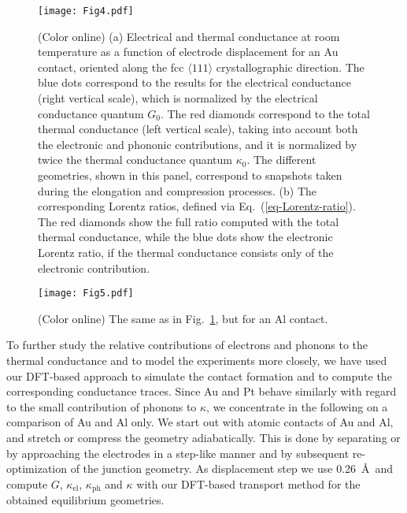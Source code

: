\documentclass[aps,amsmath,amssymb,twocolumn,showpacs]{revtex4-1}
\begin{document}
%
\begin{figure}[t]
\texttt{[image: Fig4.pdf]}
\caption{(Color online) (a) Electrical and thermal conductance at room
  temperature as a function of electrode displacement for an Au contact,
  oriented along the fcc $\langle 111 \rangle$ crystallographic direction. The
  blue dots correspond to the results for the electrical conductance (right
  vertical scale), which is normalized by the electrical conductance quantum
  $G_0$. The red diamonds correspond to the total thermal conductance (left
  vertical scale), taking into account both the electronic and phononic
  contributions, and it is normalized by twice the thermal conductance quantum
  $\kappa_0$. The different geometries, shown in this panel, correspond to
  snapshots taken during the elongation and compression processes. (b)
  The corresponding Lorentz ratios, defined via Eq.~(\ref{eq-Lorentz-ratio}). 
  The red diamonds show the full ratio computed with the total thermal 
  conductance, while the blue dots show the electronic Lorentz ratio, if the 
  thermal conductance consists only of the electronic contribution.}
\label{fig-Au-111}
\end{figure}
%

%
\begin{figure}[t]
\texttt{[image: Fig5.pdf]}
\caption{(Color online) The same as in Fig.~\ref{fig-Au-111}, but for an Al
  contact.}
\label{fig-Al-111}
\end{figure}
%

To further study the relative contributions of electrons and phonons to the
thermal conductance and to model the experiments more closely, we have used
our DFT-based approach to simulate the contact formation and to compute the
corresponding conductance traces. Since Au and Pt behave similarly with regard
to the small contribution of phonons to $\kappa$, we concentrate in the
following on a comparison of Au and Al only. We start out with
atomic contacts of Au and Al, and stretch or compress the geometry
adiabatically. This is done by separating or by approaching the electrodes
in a step-like manner and by subsequent re-optimization of the junction
geometry. As displacement step we use 0.26~\AA\ and compute $G$,
$\kappa_{\text{el}}$, $\kappa_{\text{ph}}$ and $\kappa$ with our DFT-based
transport method for the obtained equilibrium geometries.
\end{document}
